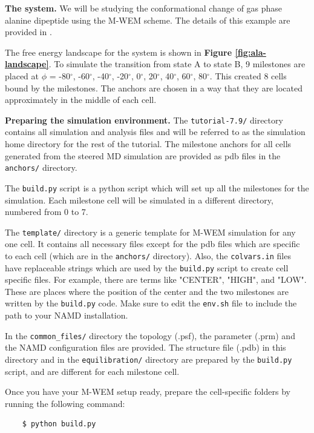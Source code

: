 \textbf{The system.} We will be studying the conformational change of gas phase alanine dipeptide using the M-WEM scheme. 
The details of this example are provided in \citep{Ray2022Markovian}. 

The free energy landscape for the system is shown in \textbf{Figure \ref{fig:ala-landscape}}. 
To simulate the transition from state A to state B, 9 milestones are placed at $\phi$ = -80$^{\circ}$,  -60$^{\circ}$, -40$^{\circ}$, -20$^{\circ}$, 0$^{\circ}$, 20$^{\circ}$, 40$^{\circ}$, 60$^{\circ}$, 80$^{\circ}$. 
This created 8 cells bound by the milestones. 
The anchors are chosen in a way that they are located approximately in the middle of each cell.

\textbf{Preparing the simulation environment.} The \verb|tutorial-7.9/| directory contains all simulation and analysis files and will be referred to as the simulation home directory for the rest of the tutorial. 
The milestone anchors for all cells generated from the steered MD simulation are provided as pdb files in the \verb|anchors/| directory. 

The \verb|build.py| script is a python script which will set up all the milestones for the simulation. 
Each milestone cell will be simulated in a different directory, numbered from 0 to 7. 

The \verb|template/| directory is a generic template for M-WEM simulation for any one cell. 
It contains all necessary files except for the pdb files which are specific to each cell (which are in the \verb|anchors/| directory). 
Also, the \verb|colvars.in| files have replaceable strings which are used by the \verb|build.py| script to create cell specific files. 
For example, there are terms like "CENTER", "HIGH", and "LOW". These are places where the position of the center and the two milestones are written by the \verb|build.py| code. 
Make sure to edit the \verb|env.sh| file to include the path to your NAMD installation.

In the \verb|common_files/| directory the topology (.psf), the parameter (.prm) and the NAMD configuration files are provided. 
The structure file (.pdb) in this directory and in the \verb|equilibration/| directory are prepared by the \verb|build.py| script, and are different for each milestone cell. 

Once you have your M-WEM setup ready, prepare the cell-specific folders by running the following command:

\begin{verbatim}
    $ python build.py
\end{verbatim}

